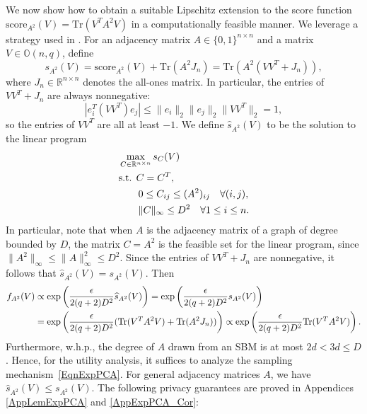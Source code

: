 \documentclass{article}
\newcommand{\real}{\mathbb{R}}
\newcommand{\Tr}{\ensuremath{\mathrm{Tr}}}
\begin{document}
We now show how to obtain a suitable Lipschitz extension to the score function $\text{score}_{A^2}(V) = \Tr(V^TA^2V)$ in a computationally feasible manner. We leverage a strategy used in \cite{kasiviswanathan2013analyzing, borgs2015private, chen2024private}. For an adjacency matrix $A \in \{0, 1\}^{n \times n}$ and a matrix $V \in \mathbb{O}(n,q)$, define
\begin{equation*}
s_{A^2}(V) = \text{score}_{A^2}(V) + \Tr(A^2 J_n) = \Tr\left(A^2(VV^T + J_n)\right),
\end{equation*}
where $J_n \in \real^{n \times n}$ denotes the all-ones matrix. In particular, the entries of $VV^T + J_n$ are always nonnegative:
\begin{equation*}
|e_i^T(VV^T)e_j| \le \|e_i\|_2 \|e_j\|_2 \|VV^T\|_2 = 1,
\end{equation*}
so the entries of $VV^T$ are all at least $-1$.
We define $\widehat{s}_{A^2}(V)$ to be the solution to the linear program
\begin{align}
\label{EqnLipLP}
& \max_{C \in \real^{n \times n}} s_C(V) \notag \\
%
& \text{s.t. } C = C^T, \notag \\
%
& \qquad 0 \le C_{ij} \le (A^2)_{ij} \quad \forall (i,j), \notag \\
%
& \qquad \|C\|_\infty \le D^2 \quad \forall 1 \le i \le n.
\end{align}
In particular, note that when $A$ is the adjacency matrix of a graph of degree bounded by $D$, the matrix $C = A^2$ is the feasible set for the linear program, since $\|A^2\|_\infty \le \|A\|_\infty^2 \le D^2$. Since the entries of $VV^T+J_n$ are nonnegative, it follows that $\widehat{s}_{A^2}(V) = s_{A^2}(V)$. Then
\begin{align}
\label{EqnExpPCA}
f_{A^2}(V) &\propto \exp\left(\frac{\epsilon}{2(q+2)D^2} \widehat{s}_{A^2}(V)\right) = \exp\left(\frac{\epsilon}{2(q+2)D^2} s_{A^2}(V)\right) \notag \\
&= \exp\left(\frac{\epsilon}{2(q+2)D^2} (\Tr(V^TA^2V) + \Tr(A^2J_n))\right) \propto \exp\left(\frac{\epsilon}{2(q+2)D^2} \Tr(V^TA^2V)\right).
\end{align}
Furthermore, w.h.p., the degree of $A$ drawn from an SBM is at most $2d < 3d \leq D$. Hence, for the utility analysis, it suffices to analyze the sampling mechanism~\eqref{EqnExpPCA}. For general adjacency matrices $A$, we have $\widehat{s}_{A^2}(V) \le s_{A^2}(V)$. The following privacy guarantees are proved in Appendices \ref{AppLemExpPCA} and \ref{AppExpPCA_Cor}:
\end{document}
